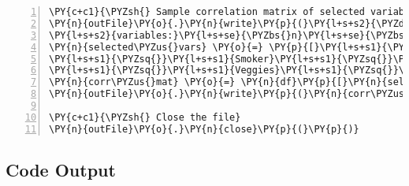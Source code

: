 \documentclass[12pt]{article}
\begin{document}
\begin{Verbatim}[commandchars=\\\{\},numbers=left,firstnumber=1,stepnumber=1,formatcom=\footnotesize]
\PY{c+c1}{\PYZsh{} Sample correlation matrix of selected variables}
\PY{n}{outFile}\PY{o}{.}\PY{n}{write}\PY{p}{(}\PY{l+s+s2}{\PYZdq{}}\PY{l+s+se}{\PYZbs{}n}\PY{l+s+s2}{Sample correlation matrix of selected }\PY{l+s+se}{\PYZbs{}}
\PY{l+s+s2}{variables:}\PY{l+s+se}{\PYZbs{}n}\PY{l+s+se}{\PYZbs{}n}\PY{l+s+s2}{\PYZdq{}}\PY{p}{)}
\PY{n}{selected\PYZus{}vars} \PY{o}{=} \PY{p}{[}\PY{l+s+s1}{\PYZsq{}}\PY{l+s+s1}{Diabetes\PYZus{}binary}\PY{l+s+s1}{\PYZsq{}}\PY{p}{,} \PY{l+s+s1}{\PYZsq{}}\PY{l+s+s1}{HighBP}\PY{l+s+s1}{\PYZsq{}}\PY{p}{,} \PY{l+s+s1}{\PYZsq{}}\PY{l+s+s1}{HighChol}\PY{l+s+s1}{\PYZsq{}}\PY{p}{,} \PY{l+s+s1}{\PYZsq{}}\PY{l+s+s1}{BMI}\PY{l+s+s1}{\PYZsq{}}\PY{p}{,} \PYZbs{}
\PY{l+s+s1}{\PYZsq{}}\PY{l+s+s1}{Smoker}\PY{l+s+s1}{\PYZsq{}}\PY{p}{,} \PY{l+s+s1}{\PYZsq{}}\PY{l+s+s1}{Stroke}\PY{l+s+s1}{\PYZsq{}}\PY{p}{,} \PY{l+s+s1}{\PYZsq{}}\PY{l+s+s1}{HeartDiseaseorAttack}\PY{l+s+s1}{\PYZsq{}}\PY{p}{,} \PY{l+s+s1}{\PYZsq{}}\PY{l+s+s1}{PhysActivity}\PY{l+s+s1}{\PYZsq{}}\PY{p}{,} \PY{l+s+s1}{\PYZsq{}}\PY{l+s+s1}{Fruits}\PY{l+s+s1}{\PYZsq{}}\PY{p}{,} \PYZbs{}
\PY{l+s+s1}{\PYZsq{}}\PY{l+s+s1}{Veggies}\PY{l+s+s1}{\PYZsq{}}\PY{p}{,} \PY{l+s+s1}{\PYZsq{}}\PY{l+s+s1}{AnyHealthcare}\PY{l+s+s1}{\PYZsq{}}\PY{p}{]}
\PY{n}{corr\PYZus{}mat} \PY{o}{=} \PY{n}{df}\PY{p}{[}\PY{n}{selected\PYZus{}vars}\PY{p}{]}\PY{o}{.}\PY{n}{corr}\PY{p}{(}\PY{p}{)}
\PY{n}{outFile}\PY{o}{.}\PY{n}{write}\PY{p}{(}\PY{n}{corr\PYZus{}mat}\PY{o}{.}\PY{n}{to\PYZus{}string}\PY{p}{(}\PY{p}{)} \PY{o}{+} \PY{l+s+s2}{\PYZdq{}}\PY{l+s+se}{\PYZbs{}n}\PY{l+s+s2}{\PYZdq{}}\PY{p}{)}

\PY{c+c1}{\PYZsh{} Close the file}
\PY{n}{outFile}\PY{o}{.}\PY{n}{close}\PY{p}{(}\PY{p}{)}
\end{Verbatim}


\subsection{Code Output}
\end{document}
